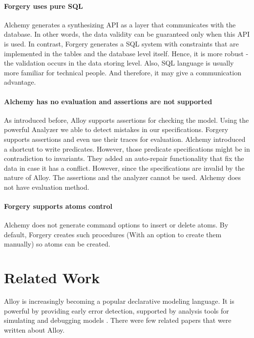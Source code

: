 \documentclass[oneside]{book}
\begin{document}
\subsubsection{Forgery uses pure SQL}
Alchemy generates a synthesizing API as a layer that communicates with the database. In other words, the data validity can be guaranteed only when this API is used. In contrast, Forgery generates a SQL system with constraints that are implemented in the tables and the database level itself. Hence, it is more robust - the validation occurs in the data storing level. Also, SQL language is usually more familiar for technical people. And therefore, it may give a communication advantage.

\subsubsection{Alchemy has no evaluation and assertions are not supported}
As introduced before, Alloy supports assertions for checking the model. Using the powerful Analyzer we able to detect mistakes in our specifications. Forgery supports assertions and even use their traces for evaluation. Alchemy introduced a shortcut to write predicates. However, those predicate specifications might be in contradiction to invariants. They added an auto-repair functionality that fix the data in case it has a conflict. However, since the specifications are invalid by the nature of Alloy. The assertions and the analyzer cannot be used. Alchemy does not have evaluation method.

\subsubsection{Forgery supports atoms control}
Alchemy does not generate command options to insert or delete atoms. By default, Forgery creates such procedures (With an option to create them manually) so atoms can be created.

\newpage

\chapter{Related Work}

Alloy is increasingly becoming a popular declarative modeling language. It is powerful by providing early error detection, supported by analysis tools for simulating and debugging models \cite{lightning}. There were few related papers that were written about Alloy.
\end{document}
